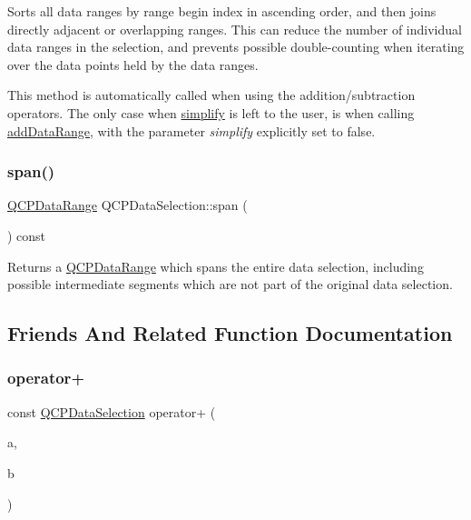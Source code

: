 Sorts all data ranges by range begin index in ascending order, and then joins directly adjacent or overlapping ranges. This can reduce the number of individual data ranges in the selection, and prevents possible double-\/counting when iterating over the data points held by the data ranges.

This method is automatically called when using the addition/subtraction operators. The only case when \hyperlink{class_q_c_p_data_selection_a4a2fbad1a6e4d1dd26fdfdf88956f2a4}{simplify} is left to the user, is when calling \hyperlink{class_q_c_p_data_selection_a46740c5aa7b80ae9b2abf6985d61b74f}{add\+Data\+Range}, with the parameter {\itshape simplify} explicitly set to false. \mbox{\label{class_q_c_p_data_selection_a890f9291e0b7f065747040de5d68ff7d}} 
\subsubsection{\texorpdfstring{span()}{span()}}
{\footnotesize\ttfamily \hyperlink{class_q_c_p_data_range}{Q\+C\+P\+Data\+Range} Q\+C\+P\+Data\+Selection\+::span (\begin{DoxyParamCaption}{ }\end{DoxyParamCaption}) const}

Returns a \hyperlink{class_q_c_p_data_range}{Q\+C\+P\+Data\+Range} which spans the entire data selection, including possible intermediate segments which are not part of the original data selection. 

\subsection{Friends And Related Function Documentation}
\mbox{\label{class_q_c_p_data_selection_a49c0217af248959d59abfdd29401b678}} 
\subsubsection{\texorpdfstring{operator+}{operator+}\hspace{0.1cm}{\footnotesize\ttfamily [1/4]}}
{\footnotesize\ttfamily const \hyperlink{class_q_c_p_data_selection}{Q\+C\+P\+Data\+Selection} operator+ (\begin{DoxyParamCaption}\item[{const \hyperlink{class_q_c_p_data_selection}{Q\+C\+P\+Data\+Selection} \&}]{a,  }\item[{const \hyperlink{class_q_c_p_data_selection}{Q\+C\+P\+Data\+Selection} \&}]{b }\end{DoxyParamCaption})\hspace{0.3cm}{\ttfamily [friend]}}

